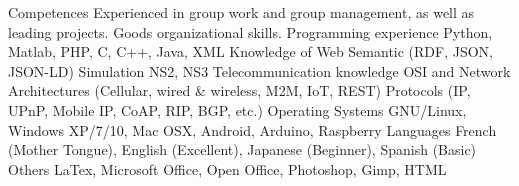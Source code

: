 \begin{cvskills}
  \cvskill
    {Competences}
    {Experienced in group work and group management, as well as leading projects.}
  \cvskill
    {}
    {Goods organizational skills.}
  \cvskill
    {Programming experience}
    {Python, Matlab, PHP, C, C++, Java, XML}
  \cvskill
    {Knowledge of}
    {Web Semantic (RDF, JSON, JSON-LD)}
  \cvskill
    {Simulation}
    {NS2, NS3}
  \cvskill
    {Telecommunication knowledge}
    {OSI and Network Architectures (Cellular, wired \& wireless, M2M, IoT, REST)}
  \cvskill
  	{}
  	{Protocols (IP, UPnP, Mobile IP, CoAP, RIP, BGP, etc.)}
  \cvskill
    {Operating Systems}
    {GNU/Linux, Windows XP/7/10, Mac OSX, Android, Arduino, Raspberry}
  \cvskill
    {Languages}
    {French (Mother Tongue), English (Excellent), Japanese (Beginner), Spanish (Basic)}
  \cvskill
    {Others}
    {LaTex, Microsoft Office, Open Office, Photoshop, Gimp, HTML}
\end{cvskills}
